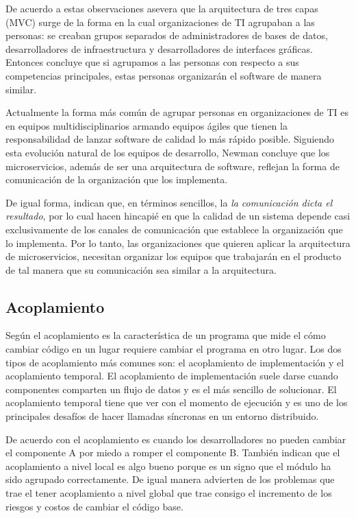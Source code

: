 De acuerdo a estas observaciones \cite{newman2019monolith} asevera que la arquitectura de tres capas
(MVC) surge de la forma en la cual organizaciones de TI agrupaban a las personas: se creaban grupos
separados de administradores de bases de datos, desarrolladores de infraestructura y desarrolladores
de interfaces gráficas. Entonces concluye que si agrupamos a las personas con respecto a sus competencias
principales, estas personas organizarán el software de manera similar.

Actualmente la forma más común de agrupar personas en organizaciones de TI es en equipos multidisciplinarios
armando equipos ágiles que tienen la responsabilidad de lanzar software de calidad lo más rápido posible.
Siguiendo esta evolución natural de los equipos de desarrollo, Newman concluye que los microservicios,
además de ser una arquitectura de software, reflejan la forma de comunicación de la organización
que los implementa.

De igual forma, \cite{nadareishvili2016microservice} indican que, en términos sencillos, la
{\it la comunicación dicta el resultado}, por lo cual hacen hincapié en que la calidad de un sistema
depende casi exclusivamente de los canales de comunicación que establece la organización que lo implementa.
Por lo tanto, las organizaciones que quieren aplicar la arquitectura de microservicios, necesitan
organizar los equipos que trabajarán en el producto de tal manera que su comunicación sea similar a 
la arquitectura.


\subsection{Acoplamiento}

Según \cite{newman2019monolith} el acoplamiento es la característica de un programa que mide el cómo
cambiar código en un lugar requiere cambiar el programa en otro lugar.
Los dos tipos de acoplamiento más comunes son: el acoplamiento de implementación y el acoplamiento temporal.
El acoplamiento de implementación suele darse cuando componentes comparten un flujo de datos y es el más
sencillo de solucionar.
El acoplamiento temporal tiene que ver con el momento de ejecución y es uno de los principales
desafíos de hacer llamadas síncronas en un entorno distribuido.

De acuerdo con \cite{percival2020architecture} el acoplamiento es cuando los desarrolladores no
pueden cambiar el componente A por miedo a romper el componente B. También indican que el
acoplamiento a nivel local es algo bueno porque es un signo que el módulo ha sido agrupado correctamente.
De igual manera advierten de los problemas que trae el tener acoplamiento a nivel global que trae
consigo el incremento de los riesgos y costos de cambiar el código base.


